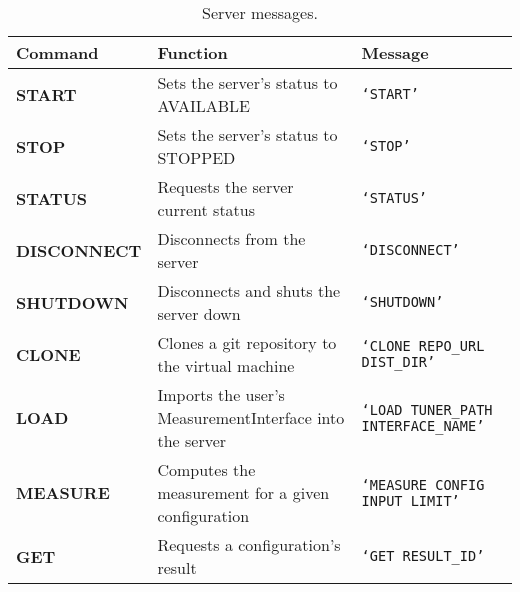 \newcommand{\specialcell}[2][c]{%
  \begin{tabular}[#1]{@{}K@{}}#2\end{tabular}}


\begin{table}[htpb]
    \centering
    \scriptsize
    \begin{tabular}{@{}TLK@{}}
        \toprule
        {\bf Command} & {\bf Function} & {\bf Message} \\ \midrule
        {\scriptsize \bf START} &
        {\scriptsize Sets the server's status to AVAILABLE} &
        {\scriptsize \tt \lq{}START\rq{}} \\ \midrule
        {\scriptsize \bf STOP} &
        {\scriptsize Sets the server's status to STOPPED} &
        {\scriptsize \tt \lq{}STOP\rq{}} \\ \midrule
        {\scriptsize \bf STATUS} &
        {\scriptsize Requests the server current status} &
        {\scriptsize \tt \lq{}STATUS\rq{}} \\ \midrule
        {\scriptsize \bf DISCONNECT} &
        {\scriptsize Disconnects from the server} &
        {\scriptsize \tt \lq{}DISCONNECT\rq{}} \\ \midrule
        {\scriptsize \bf SHUTDOWN} &
        {\scriptsize Disconnects and shuts the server down} &
        {\scriptsize \tt \lq{}SHUTDOWN\rq{}} \\ \midrule
        {\scriptsize \bf CLONE} &
        {\scriptsize Clones a git repository to the virtual machine} &
        {\scriptsize \tt \lq{}CLONE REPO\_URL DIST\_DIR\rq{}} \\ \midrule
        {\scriptsize \bf LOAD} &
        {\scriptsize Imports the user's MeasurementInterface into the server} &
        {\scriptsize \tt \lq{}LOAD TUNER\_PATH INTERFACE\_NAME\rq{}} \\ \midrule
        {\scriptsize \bf MEASURE} &
        {\scriptsize Computes the measurement for a given configuration} &
        {\scriptsize \tt \lq{}MEASURE CONFIG INPUT LIMIT\rq{}} \\ \midrule
        {\scriptsize \bf GET} &
        {\scriptsize Requests a configuration's result} &
        {\scriptsize \tt \lq{}GET RESULT\_ID\rq{}} \\ \bottomrule
    \end{tabular}
    \caption{Server messages.}
    \label{tab:protocol-messages}
\end{table}
